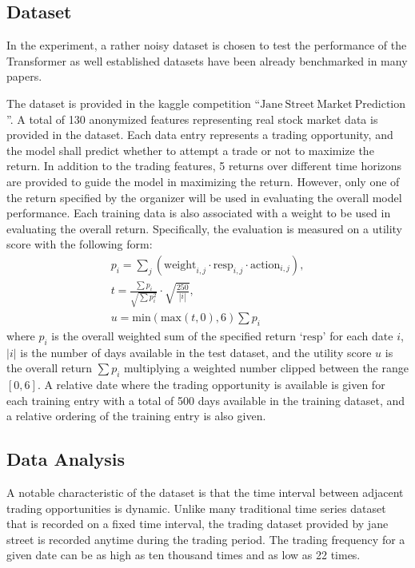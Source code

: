 \documentclass{article} %
\begin{document}
\subsection{Dataset}

In the experiment, a rather noisy dataset is chosen to test the performance of the Transformer as well established datasets have been already benchmarked in many papers.

The dataset is provided in the kaggle competition ``$\mathrm{Jane \ Street \ Market \ Prediction}$''.
A total of 130 anonymized features representing real stock market data is provided in the dataset.
Each data entry represents a trading opportunity, and the model shall predict whether to attempt a trade or not to maximize the return.
In addition to the trading features, 5 returns over different time horizons are provided to guide the model in maximizing the return.
However, only one of the return specified by the organizer will be used in evaluating the overall model performance.
Each training data is also associated with a weight to be used in evaluating the overall return.
Specifically, the evaluation is measured on a utility score with the following form:
\begin{gather}
        p_{i} = \underset{j}{\sum} (\mathrm{weight}_{i, j} \cdot \mathrm{resp}_{i, j} \cdot \mathrm{action}_{i, j} ), \\
        t = \frac{\sum p_{i}}{\sqrt{\sum p_{i}^{2}}} \cdot \sqrt{\frac{250}{|i|}}, \\
        u = \mathrm{min}(\mathrm{max}(t, 0), 6) \sum p_{i}
\end{gather}
where $p_{i}$ is the overall weighted sum of the specified return `$\mathrm{resp}$' for each date $i$, $|i|$ is the number of days available in the test dataset, and the utility score $u$ is the overall return $\sum p_{i}$ multiplying a weighted number clipped between the range $[0, 6]$.
A relative date where the trading opportunity is available is given for each training entry with a total of 500 days available in the training dataset, and a relative ordering of the training entry is also given.

\subsection{Data Analysis}

A notable characteristic of the dataset is that the time interval between adjacent trading opportunities is dynamic.
Unlike many traditional time series dataset that is recorded on a fixed time interval, the trading dataset provided by jane street is recorded anytime during the trading period.
The trading frequency for a given date can be as high as ten thousand times and as low as 22 times.
\end{document}
